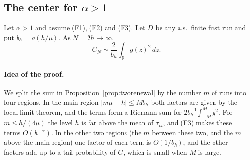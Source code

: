 \subsection{The center for \texorpdfstring{$\alpha>1$}{alpha > 1}}

\begin{proposition}\label{prop:C-center}
Let $\alpha>1$ and assume \textup{(F1)}, \textup{(F2)} and \textup{(F3)}. Let $D$ be any
a.s.\ finite first run and put $b_h=a(h/\mu)$. As $N=2h\to\infty$,
\[
C_N\sim\frac2{b_h}\int_{\mathbb R}g(z)^2\,dz .
\]
\end{proposition}

\paragraph{Idea of the proof.}
We split the sum in Proposition~\ref{prop:tworenewal} by the number $m$ of runs into four
regions. In the main region $\lvert m\mu-h\rvert\le Mb_h$ both factors are given by the
local limit theorem, and the terms form a Riemann sum for $2b_h^{-1}\int_{-M}^Mg^2$. For
$m\le h/(4\mu)$ the level $h$ is far above the mean of $\tau_m$, and (F3) makes these terms
$O(h^{-\alpha})$. In the other two regions (the $m$ between these two, and the $m$ above
the main region) one factor of each term is $O(1/b_h)$, and the other factors add up to a
tail probability of $G$, which is small when $M$ is large.

